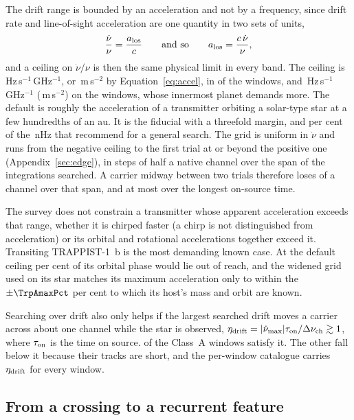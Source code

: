 The drift range is bounded by an acceleration and not by a frequency, since
drift rate and line-of-sight acceleration are one quantity in two sets of
units,
%
\begin{equation}
\frac{\dot\nu}{\nu}=\frac{a_{\rm los}}{c}
\qquad\text{and so}\qquad
a_{\rm los}=\frac{c\,\dot\nu}{\nu},
\label{eq:accel}
\end{equation}
%
and a ceiling on $\dot\nu/\nu$ is then the same physical limit in every band.
The ceiling is \DriftCeilLo\,Hz\,s$^{-1}$\,GHz$^{-1}$, or
\AccelCeilMed\,m\,s$^{-2}$ by Equation~\ref{eq:accel}, in \AccelNDefault{} of
the \NWinA{} windows, and \DriftCeilHi\,Hz\,s$^{-1}$\,GHz$^{-1}$
(\AccelCeilMax\,m\,s$^{-2}$) on the \AccelNWide{} \AccelWideStar{} windows,
whose innermost planet demands more. The default is roughly the acceleration
of a transmitter orbiting a solar-type star at a few hundredths of an au. It
is the \citet{Mason2025} fiducial with a threefold margin, and
\AccelSheikhPct{} per cent of the \AccelSheikhNHz\,nHz that
\citet{Sheikh2019} recommend for a general search. The grid is uniform in
$\dot\nu$ and runs from the negative ceiling to the first trial at or beyond
the positive one (Appendix~\ref{sec:edge}), in steps of half a native channel
over the span of the integrations searched. A carrier midway between two
trials therefore loses \DriftGridSpanHalf{} of a channel over that span, and
at most \DriftGridFineHalf{} over the longest on-source time.

The survey does not constrain a transmitter whose apparent
acceleration exceeds that range, whether it is chirped faster (a chirp is
not distinguished from acceleration) or its orbital and
rotational accelerations together exceed it. Transiting TRAPPIST-1~b is the
most demanding known case. At the default ceiling \TrapPhaseHi{} per cent of
its orbital phase would lie out of reach, and the widened grid used on its
star matches its maximum acceleration only to within the $\pm\TrpAmaxPct$ per
cent to which its host's mass and orbit are known.

Searching over drift also only helps if the largest searched drift moves a
carrier across about one channel while the star is observed,
$\eta_{\rm drift}=|\dot\nu_{\max}|\tau_{\rm on}/\Delta\nu_{\rm ch}\gtrsim1$,
where $\tau_{\rm on}$ is the time on source. \EtaDriftAOk{} of the \NWinA{}
Class~A windows satisfy it. The other \EtaDriftALo{} fall below it because
their tracks are short, and the per-window catalogue carries
$\eta_{\rm drift}$ for every window.

\subsection{From a crossing to a recurrent feature}
\label{sec:summary}

